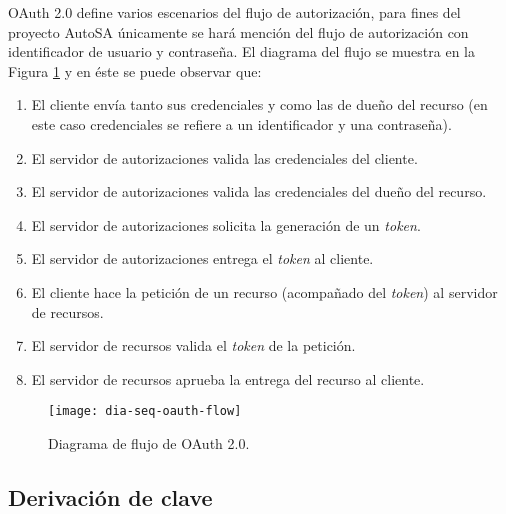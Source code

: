 OAuth 2.0 define varios escenarios del flujo de autorización, para fines del proyecto AutoSA únicamente se hará mención del flujo de autorización con identificador de usuario y contraseña\cite{OAuthRFC, OAuth2Identity}. El diagrama del flujo se muestra en la Figura \ref{fig:dia-seq-oauth-flow} y en éste se puede observar que:
\begin{enumerate}
	\item El cliente envía tanto sus credenciales y como las de dueño del recurso (en este caso credenciales se refiere a un identificador y una contraseña).
	\item El servidor de autorizaciones valida las credenciales del cliente.
	\item El servidor de autorizaciones valida las credenciales del dueño del recurso.
	\item El servidor de autorizaciones solicita la generación de un \textit{token}.
	\item El servidor de autorizaciones entrega el \textit{token} al cliente.
	\item El cliente hace la petición de un recurso (acompañado del \textit{token}) al servidor de recursos.
	\item El servidor de recursos valida el \textit{token} de la petición. 
	\item El servidor de recursos aprueba la entrega del recurso al cliente.
\end{enumerate}

\begin{figure}[h]
	\centering
	\texttt{[image: dia-seq-oauth-flow]}
	\caption{Diagrama de flujo de OAuth 2.0.}
	\label{fig:dia-seq-oauth-flow}
\end{figure}

\subsection{Derivación de clave}\label{sec:key-derivation}

